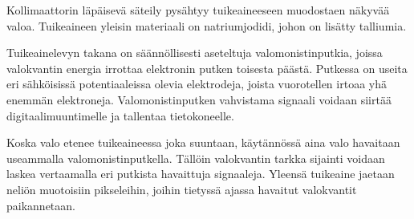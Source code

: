 Kollimaattorin läpäisevä säteily pysähtyy tuikeaineeseen muodostaen näkyvää valoa. Tuikeaineen yleisin materiaali on natriumjodidi, johon on lisätty talliumia.\cite{cherry_gamma_2012, cherry_single_2012}

Tuikeainelevyn takana on säännöllisesti aseteltuja valomonistinputkia, joissa valokvantin energia irrottaa elektronin putken toisesta päästä. Putkessa on useita eri sähköisissä potentiaaleissa olevia elektrodeja, joista vuorotellen irtoaa yhä enemmän elektroneja. Valomonistinputken vahvistama signaali voidaan siirtää digitaalimuuntimelle ja tallentaa tietokoneelle.

Koska valo etenee tuikeaineessa joka suuntaan, käytännössä aina valo havaitaan useammalla valomonistinputkella. Tällöin valokvantin tarkka sijainti voidaan laskea vertaamalla eri putkista havaittuja signaaleja. Yleensä tuikeaine jaetaan neliön muotoisiin pikseleihin, joihin tietyssä ajassa havaitut valokvantit paikannetaan.